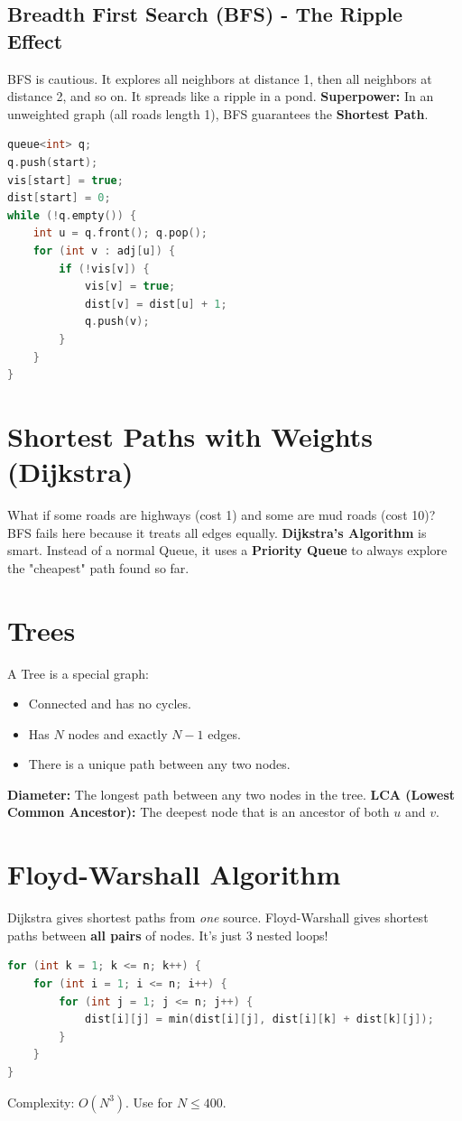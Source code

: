 \documentclass[12pt, a4paper]{report}
\begin{document}
\subsection{Breadth First Search (BFS) - The Ripple Effect}
BFS is cautious. It explores all neighbors at distance 1, then all neighbors at distance 2, and so on. It spreads like a ripple in a pond.
\textbf{Superpower:} In an unweighted graph (all roads length 1), BFS guarantees the \textbf{Shortest Path}.

\begin{lstlisting}[language=C++]
queue<int> q;
q.push(start);
vis[start] = true;
dist[start] = 0;
while (!q.empty()) {
    int u = q.front(); q.pop();
    for (int v : adj[u]) {
        if (!vis[v]) {
            vis[v] = true;
            dist[v] = dist[u] + 1;
            q.push(v);
        }
    }
}
\end{lstlisting}

\section{Shortest Paths with Weights (Dijkstra)}
What if some roads are highways (cost 1) and some are mud roads (cost 10)? BFS fails here because it treats all edges equally.
\textbf{Dijkstra's Algorithm} is smart. Instead of a normal Queue, it uses a \textbf{Priority Queue} to always explore the "cheapest" path found so far.

\section{Trees}
A Tree is a special graph:
\begin{itemize}
    \item Connected and has no cycles.
    \item Has $N$ nodes and exactly $N-1$ edges.
    \item There is a unique path between any two nodes.
\end{itemize}
\textbf{Diameter:} The longest path between any two nodes in the tree.
\textbf{LCA (Lowest Common Ancestor):} The deepest node that is an ancestor of both $u$ and $v$.

\section{Floyd-Warshall Algorithm}
Dijkstra gives shortest paths from \textit{one} source. Floyd-Warshall gives shortest paths between \textbf{all pairs} of nodes.
It's just 3 nested loops!
\begin{lstlisting}[language=C++]
for (int k = 1; k <= n; k++) {
    for (int i = 1; i <= n; i++) {
        for (int j = 1; j <= n; j++) {
            dist[i][j] = min(dist[i][j], dist[i][k] + dist[k][j]);
        }
    }
}
\end{lstlisting}
Complexity: $O(N^3)$. Use for $N \le 400$.
\end{document}
